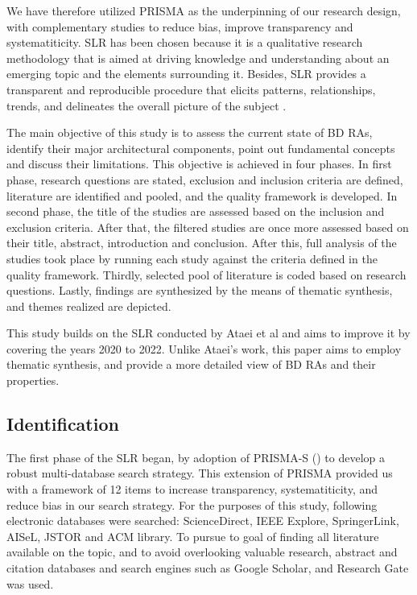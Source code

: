 \documentclass{ieeeaccess}
\begin{document}
We have therefore utilized PRISMA as the underpinning of our research design, with complementary studies to reduce bias, improve transparency and systematiticity. SLR has been chosen because it is a qualitative research methodology that is aimed at driving knowledge and understanding about an emerging topic and the elements surrounding it. Besides, SLR provides a transparent and reproducible procedure that elicits patterns, relationships, trends, and delineates the overall picture of the subject \cite{borrego2014systematic}.

The main objective of this study is to assess the current state of BD RAs, identify their major architectural components, point out fundamental concepts and discuss their limitations. This objective is achieved in four phases. In first phase, research questions are stated, exclusion and inclusion criteria are defined, literature are identified and pooled, and the quality framework is developed. In second phase, the title of the studies are assessed based on the inclusion and exclusion criteria. After that, the filtered studies are once more assessed based on their title, abstract, introduction and conclusion. After this, full analysis of the studies took place by running each study against the criteria defined in the quality framework. Thirdly, selected pool of literature is coded based on research questions. Lastly, findings are synthesized by the means of thematic synthesis, and themes realized are depicted.

This study builds on the SLR conducted by Ataei et al \cite{AtaeiACIS} and aims to improve it by covering the years 2020 to 2022. Unlike Ataei's work, this paper aims to employ thematic synthesis, and provide a more detailed view of BD RAs and their properties.

\subsection{Identification}

The first phase of the SLR began, by adoption of PRISMA-S (\cite{rethlefsen2021prisma}) to develop a robust multi-database search strategy. This extension of PRISMA provided us with a framework of 12 items to increase transparency, systematiticity, and reduce bias in our search strategy. For the purposes of this study, following electronic databases were searched: ScienceDirect, IEEE Explore, SpringerLink, AISeL, JSTOR and ACM library. To pursue to goal of finding all literature available on the topic, and to avoid overlooking valuable research, abstract and citation databases and search engines such as Google Scholar, and Research Gate was used.
\end{document}
